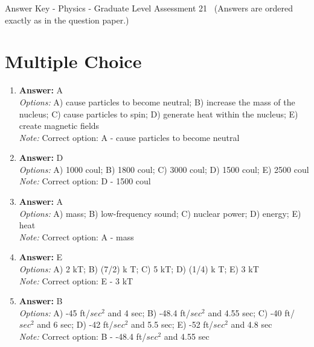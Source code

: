 \documentclass[12pt]{article}
\begin{document}
\begin{center}
Answer Key - Physics - Graduate Level Assessment 21 \
\small (Answers are ordered exactly as in the question paper.)
\end{center}

\section*{Multiple Choice}
\begin{enumerate}[label=\arabic*.]
\item \textbf{Answer:} A
\\ \textit{Options:} A) cause particles to become neutral; B) increase the mass of the nucleus; C) cause particles to spin; D) generate heat within the nucleus; E) create magnetic fields
\\ \textit{Note:} Correct option: A - cause particles to become neutral
\item \textbf{Answer:} D
\\ \textit{Options:} A) 1000 coul; B) 1800 coul; C) 3000 coul; D) 1500 coul; E) 2500 coul
\\ \textit{Note:} Correct option: D - 1500 coul
\item \textbf{Answer:} A
\\ \textit{Options:} A) mass; B) low-frequency sound; C) nuclear power; D) energy; E) heat
\\ \textit{Note:} Correct option: A - mass
\item \textbf{Answer:} E
\\ \textit{Options:} A) 2 kT; B) (7/2) k T; C) 5 kT; D) (1/4) k T; E) 3 kT
\\ \textit{Note:} Correct option: E - 3 kT
\item \textbf{Answer:} B
\\ \textit{Options:} A) -45 ft/$sec^2$ and 4 sec; B) -48.4 ft/$sec^2$ and 4.55 sec; C) -40 ft/$sec^2$ and 6 sec; D) -42 ft/$sec^2$ and 5.5 sec; E) -52 ft/$sec^2$ and 4.8 sec
\\ \textit{Note:} Correct option: B - -48.4 ft/$sec^2$ and 4.55 sec
\end{enumerate}
\end{document}
